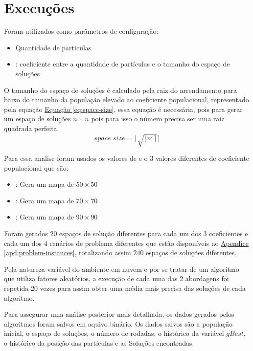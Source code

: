 \section{Execuções}
Foram utilizados como parâmetros de configuração:
\begin{itemize}
    \item {} Quantidade de particulas
    \item {}: coeficiente entre a quantidade de partículas e o tamanho do espaço de soluções
\end{itemize}
%
O tamanho do espaço de soluções é calculado pela raiz do arrendamento para baixo do tamanho da população elevado ao coeficiente populacional, representado pela equação 
\hyperref[eq:space-size]{Equação \ref{eq:space-size}}, 
essa equação é necessária, pois para gerar um espaço de soluções $n \times n$ pois para isso o número precisa ser uma raiz quadrada perfeita.
%
\begin{equation} 
    \label{eq:space-size}
    space\_size = \lfloor \sqrt{\lfloor n^c \rceil} \rceil
\end{equation}
%


Para essa analise foram usados os valores de  e o 3 valores diferentes de coeficiente populacional que são:
\begin{itemize}
    \item {}: Gera um mapa de $50 \times 50$
    \item {}: Gera um mapa de $70 \times 70$
    \item {}: Gera um mapa de $90 \times 90$
\end{itemize}

Foram gerados 20 espaços de solução diferentes para cada um dos 3 coeficientes e cada um dos 4 cenários de problema diferentes que estão disponíveis no 
\hyperref[apd:problem-instances]{Apendice \ref{apd:problem-instances}}, totalizando assim $240$ espaços de soluções diferentes.


Pela natureza variável do ambiente em nuvem e por se tratar de um algoritmo que utiliza fatores aleatórios, a execução de cada uma das 2 abordagens foi repetida 20 vezes para assim obter uma média mais precisa das soluções de cada algoritmo.


Para assegurar uma análise posterior mais detalhada, os dados gerados pelos algoritmos foram salvos em aquivo binário.
Os dados salvos são a população inicial, o espaço de soluções, o número de rodadas, o histórico da variável $gBest$, o histórico da posição das partículas e as Soluções encontradas.
